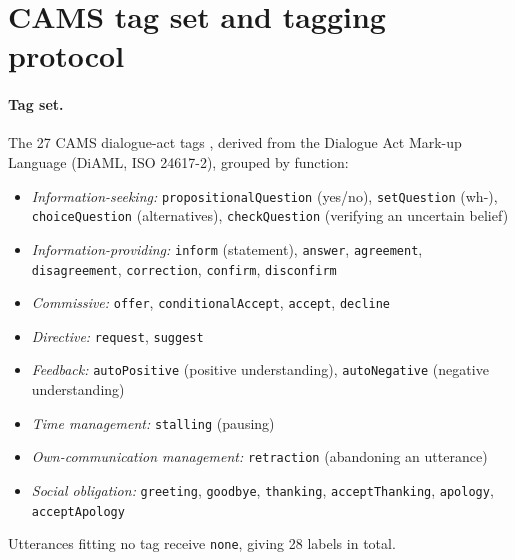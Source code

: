 \documentclass[11pt]{article}
\begin{document}
\appendix

\section{CAMS tag set and tagging protocol}
\label{app:tagging}

\paragraph{Tag set.} The 27 CAMS dialogue-act tags \citep{duran2022cams},
derived from the Dialogue Act Mark-up Language (DiAML, ISO 24617-2), grouped
by function:

\begin{itemize}\setlength\itemsep{0pt}\raggedright
\item \emph{Information-seeking:} \texttt{propositionalQuestion} (yes/no),
  \texttt{setQuestion} (wh-), \texttt{choiceQuestion} (alternatives),
  \texttt{checkQuestion} (verifying an uncertain belief)
\item \emph{Information-providing:} \texttt{inform} (statement),
  \texttt{answer}, \texttt{agreement}, \texttt{disagreement},
  \texttt{correction}, \texttt{confirm}, \texttt{disconfirm}
\item \emph{Commissive:} \texttt{offer}, \texttt{conditionalAccept},
  \texttt{accept}, \texttt{decline}
\item \emph{Directive:} \texttt{request}, \texttt{suggest}
\item \emph{Feedback:} \texttt{autoPositive} (positive understanding),
  \texttt{autoNegative} (negative understanding)
\item \emph{Time management:} \texttt{stalling} (pausing)
\item \emph{Own-communication management:} \texttt{retraction} (abandoning
  an utterance)
\item \emph{Social obligation:} \texttt{greeting}, \texttt{goodbye},
  \texttt{thanking}, \texttt{acceptThanking}, \texttt{apology},
  \texttt{acceptApology}
\end{itemize}

\noindent Utterances fitting no tag receive \texttt{none}, giving 28 labels
in total.
\end{document}
